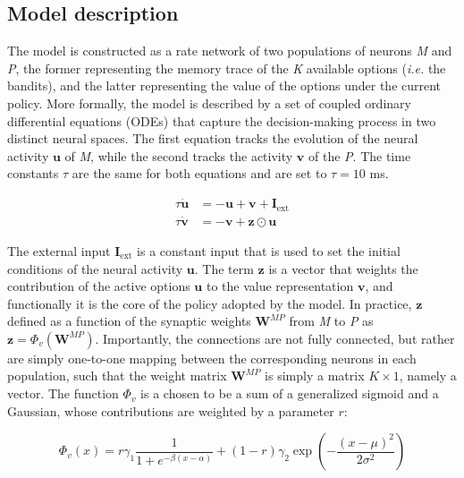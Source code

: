 
\subsection{Model description}
The model is constructed as a rate network of two populations of neurons \textit{M} and \textit{P}, the former representing the memory trace of the \textit{K} available options (\textit{i.e.} the bandits), and the latter representing the value of the options under the current policy.
More formally, the model is described by a set of coupled ordinary differential equations (ODEs) that capture the decision-making process in two distinct neural spaces.
The first equation tracks the evolution of the neural activity $\textbf{u}$ of \textit{M}, while the second tracks the activity $\textbf{v}$ of the \textit{P}. The time constants $\tau$ are the same for both equations and are set to $\tau = 10$ ms.


\begin{equation}
\begin{aligned}
    \tau \dot{\textbf{u}}&= -\textbf{u} + \textbf{v} + \textbf{I}_{\text{ext}} \\
    \tau \dot{\textbf{v}}&= -\textbf{v} + \textbf{z} \odot\textbf{u}
\end{aligned}
\end{equation}

\noindent The external input $\textbf{I}_{\text{ext}}$ is a constant input that is used to set the initial conditions of the neural activity $\textbf{u}$.
The term $\textbf{z}$ is a vector that weights the contribution of the active options $\textbf{u}$ to the value representation $\textbf{v}$, and functionally it is the core of the policy adopted by the model.
In practice, $\textbf{z}$ defined as a function of the synaptic weights $\textbf{W}^{MP}$ from \textit{M} to \textit{P} as $\textbf{z} = \Phi_v(\textbf{W}^{MP})$. Importantly, the connections are not fully connected, but rather are simply one-to-one mapping between the corresponding neurons in each
population, such that the weight matrix $\textbf{W}^{MP}$ is simply a matrix $K\times 1$, namely a vector.
The function $\Phi_v$ is a chosen to be a sum of a generalized sigmoid and a Gaussian, whose contributions are weighted by a parameter $r$:

\begin{equation*}
    \Phi_v(x) = r\gamma_{1} \frac{1}{1 + e^{-\beta(x-\alpha)}} + (1-r)\gamma_{2} \exp\left(-\frac{(x-\mu)^2}{2\sigma^2}\right)
\end{equation*}

